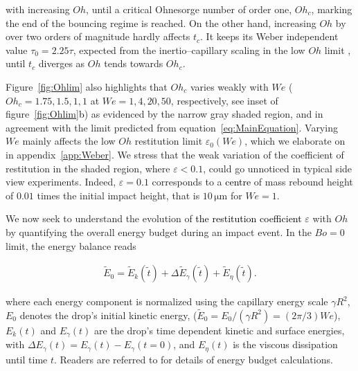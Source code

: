 \documentclass{jfm}
\newcommand{\Ohn}{\mathit{Oh}}
\newcommand{\Ohc}{\mathit{Oh}_\mathit{c}}
\newcommand{\Wen}{\mathit{We}}
\newcommand{\Bon}{\mathit{Bo}}
\newcommand{\revRev}[1]{\textcolor{black}{#1}}
\begin{document}
\noindent with increasing $\Ohn$, until a critical Ohnesorge number of order one, $\Ohc$, marking the end of the bouncing regime is reached.
On the other hand, increasing $\Ohn$ by over two orders of magnitude hardly affects $t_c$. It keeps its Weber independent value $\tau_0 = 2.25\tau$, expected from the inertio--capillary scaling in the low $\Ohn$ limit \citep{wachters1966heat,richard2002contact}, until $t_c$ diverges as $\Ohn$ tends towards $\Ohc$.

Figure~\ref{fig:Ohlim} also highlights that $\Ohc$ varies weakly with $\Wen$ ($\Ohc = 1.75, 1.5, 1, 1$ at $\Wen = 1, 4, 20, 50$, respectively, see inset of figure~\ref{fig:Ohlim}\revRev{b}) as evidenced by the narrow gray shaded region, and in agreement with the limit predicted from equation~\eqref{eq:MainEquation}.
Varying $\Wen$ mainly affects the low $\Ohn$ restitution limit $\varepsilon_0\left(\Wen\right)$, which we elaborate on in appendix~\ref{app:Weber}.
We stress that the weak variation of the coefficient of restitution in the shaded region, where $\varepsilon<0.1$, could go unnoticed in typical side view experiments.
Indeed, $\varepsilon = 0.1$ corresponds to a \revRev{centre} of mass rebound height of $0.01$ times the initial impact height, that is $10\,\si{\micro\meter}$ for $\Wen = 1$.

We now seek to understand the evolution of \revRev{the restitution coefficient} $\varepsilon$ with $\Ohn$ by quantifying the overall energy budget during an impact event.
In the $\Bon = 0$ limit, the energy balance reads

\begin{align}
	\label{eqn:OhEnergyBalance}
	\tilde{E}_0 = \tilde{E}_k(\tilde{t}) + \Delta\tilde{E}_\gamma(\tilde{t}) + \tilde{E}_\eta(\tilde{t}).
\end{align}

\noindent where each energy component is normalized using the capillary energy scale $\gamma R^2$, $E_0$ denotes the drop's initial kinetic energy, ($\tilde{E}_0 = E_0/(\gamma R^2) = (2\pi/3)\Wen$), $E_k(t)$ and $E_\gamma(t)$ are the drop's time dependent kinetic and surface energies, with $\Delta E_\gamma(t) = E_\gamma(t) - E_\gamma(t = 0)$, and $E_\eta(t)$ is the viscous dissipation until time $t$. Readers are referred to \citet{landau2013course, wildeman-2016-jfm, ramirezsoto-2020-sciadv, sanjay2022taylor, VatsalThesis} for details of energy budget calculations. 
\end{document}
